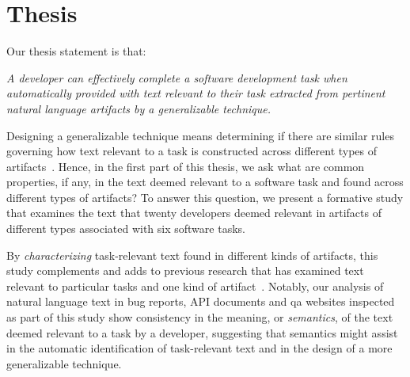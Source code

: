

\section{Thesis}
\label{cp1:thesis}




Our thesis statement is that:




\bigskip
\begin{bluequote}
    \textit{A developer can effectively complete a software development task when automatically provided with text relevant to their task extracted from pertinent natural language artifacts
    by a generalizable technique.}
\end{bluequote}
\medskip



Designing a generalizable technique means 
determining if there are similar rules governing how text relevant to a task is 
constructed across different types of artifacts~\cite{Kintsch1978a}.
Hence, in the first part of this thesis, 
we ask what are common properties, if any, in the text deemed relevant 
to a software task and found across different types of artifacts?
To answer this question, we present a formative study that 
examines the text that twenty developers deemed relevant in artifacts 
of different types associated with six software tasks.

% 

By \textit{characterizing} task-relevant text found in different kinds of artifacts,
this study complements and adds to previous research that has
examined text relevant to particular tasks and one kind of artifact~\cite{Ko2006, Rastkar2010, Chaparro2017, Robillard2015}.
Notably, our analysis of natural language text  in bug
reports, API documents and \ac{qa} websites 
inspected as part of this study 
 show consistency in the meaning, or \textit{semantics}, of the
 text deemed relevant to a task by a developer, suggesting that 
semantics might assist in the automatic identification of
task-relevant text and in the design of a more generalizable technique.




